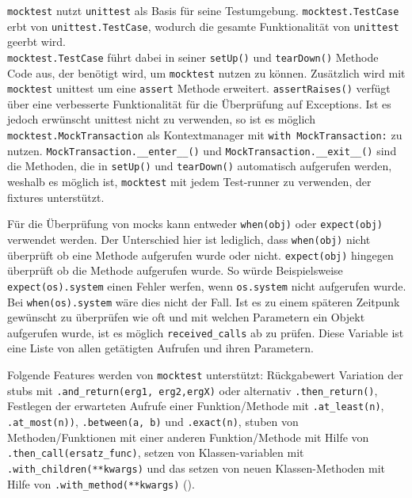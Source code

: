 \lstinline{mocktest} nutzt \lstinline{unittest} als Basis für seine
Testumgebung. \lstinline{mocktest.TestCase} erbt von
\lstinline{unittest.TestCase}, wodurch die gesamte Funktionalität von
\lstinline{unittest} geerbt wird.
\\  %
\lstinline{mocktest.TestCase} führt dabei in
seiner \lstinline{setUp()} und \lstinline{tearDown()} Methode Code aus, der
benötigt wird, um \lstinline{mocktest} nutzen zu können. Zusätzlich wird mit
\lstinline{mocktest} unittest um eine \lstinline{assert} Methode erweitert.
\lstinline{assertRaises()} verfügt über eine verbesserte Funktionalität für die
Überprüfung auf Exceptions. Ist es jedoch erwünscht unittest nicht zu verwenden,
so ist es möglich \lstinline{mocktest.MockTransaction} als Kontextmanager mit
\lstinline{with MockTransaction:} zu nutzen.
\lstinline{MockTransaction.__enter__()} und
\lstinline{MockTransaction.__exit__()} sind die Methoden, die in
\lstinline{setUp()} und \lstinline{tearDown()} automatisch aufgerufen werden,
weshalb es möglich ist, \lstinline{mocktest} mit jedem Test-runner zu verwenden,
der \Glspl{fixture} unterstützt.
\newline

Für die Überprüfung von \Glspl{mock} kann entweder \lstinline{when(obj)} oder
\lstinline{expect(obj)} verwendet werden. Der Unterschied hier ist lediglich,
dass \lstinline{when(obj)} nicht überprüft ob eine Methode aufgerufen wurde oder
nicht. \lstinline{expect(obj)} hingegen überprüft ob die Methode aufgerufen
wurde. So würde Beispielsweise \lstinline{expect(os).system} einen Fehler
werfen, wenn \lstinline{os.system} nicht aufgerufen wurde. Bei
\lstinline{when(os).system} wäre dies nicht der Fall. Ist es zu einem späteren
Zeitpunk gewünscht zu überprüfen wie oft und mit welchen Parametern ein Objekt
aufgerufen wurde, ist es möglich \lstinline{received_calls} ab zu prüfen. Diese
Variable ist eine Liste von allen getätigten Aufrufen und ihren Parametern.
\newline

Folgende Features werden von \lstinline{mocktest} unterstützt:
Rückgabewert Variation der \Glspl{stub} mit
\lstinline{.and_return(erg1, erg2,ergX)} oder alternativ
\lstinline{.then_return()}, Festlegen der erwarteten Aufrufe einer
Funktion/Methode mit \lstinline{.at_least(n)}, \lstinline{.at_most(n))},
\lstinline{.between(a, b)} und \lstinline{.exact(n)}, \gls{stub}en von
Methoden/Funktionen mit einer anderen Funktion/Methode mit Hilfe von
\lstinline{.then_call(ersatz_func)}, setzen von Klassen-variablen mit
\lstinline{.with_children(**kwargs)} und das setzen von neuen Klassen-Methoden
mit Hilfe von \lstinline{.with_method(**kwargs)} (\cite{mocktest:doc}).
\newline

